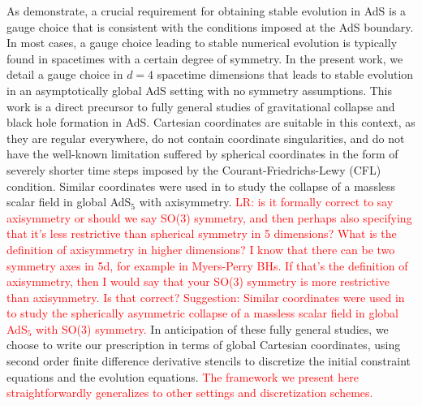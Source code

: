 \documentclass[a4paper,11pt]{article}
\numberwithin{equation}{section}
\begin{document}
As \cite{Bantilan:2012vu} demonstrate, a crucial requirement for obtaining stable evolution in AdS is a gauge choice that is consistent with the conditions imposed at the AdS boundary.
In most cases, a gauge choice leading to stable numerical evolution is typically found in spacetimes with a certain degree of symmetry.
In the present work, we detail a gauge choice in $d=4$ spacetime dimensions that leads to stable evolution in an asymptotically global AdS setting with no symmetry assumptions.
This work is a direct precursor to fully general studies of gravitational collapse and black hole formation in AdS.
Cartesian coordinates are suitable in this context, as they are regular everywhere, do not contain coordinate singularities, and do not have the well-known limitation suffered by spherical coordinates in the form of severely shorter time steps imposed by the Courant-Friedrichs-Lewy (CFL) condition. 
Similar coordinates were used in \cite{Bantilan:2017kok} to study the collapse of a massless scalar field in global AdS$_5$ with axisymmetry. \textcolor{red}{LR: is it formally correct to say axisymmetry or should we say SO(3) symmetry, and then perhaps also specifying that it's less restrictive than spherical symmetry in 5 dimensions? What is the definition of axisymmetry in higher dimensions? I know that there can be two symmetry axes in 5d, for example in Myers-Perry BHs. If that's the definition of axisymmetry, then I would say that your SO(3) symmetry is more restrictive than axisymmetry. Is that correct?
Suggestion: Similar coordinates were used in \cite{Bantilan:2017kok} to study the spherically asymmetric collapse of a massless scalar field in global AdS$_5$ with SO(3) symmetry.}
In anticipation of these fully general studies, we choose to write our prescription in terms of global Cartesian coordinates, using second order finite difference derivative stencils to discretize the initial constraint equations and the evolution equations. 
\textcolor{red}{The framework we present here straightforwardly generalizes to other settings and discretization schemes.}
\end{document}
